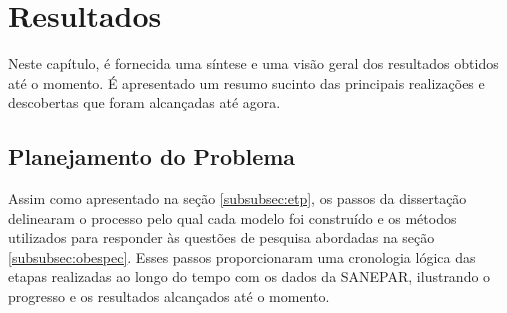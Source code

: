 \section{Resultados} \label{sec:result}

Neste capítulo, é fornecida uma síntese e uma visão geral dos resultados obtidos até o momento. É apresentado um resumo sucinto das principais realizações e descobertas que foram alcançadas até agora.


\subsection{Planejamento do Problema} \label{subsec:planexp}

Assim como apresentado na seção \ref{subsubsec:etp}, os passos da dissertação delinearam o processo pelo qual cada modelo foi construído e os métodos utilizados para responder às questões de pesquisa abordadas na seção \ref{subsubsec:obespec}. Esses passos proporcionaram uma cronologia lógica das etapas realizadas ao longo do tempo com os dados da SANEPAR, ilustrando o progresso e os resultados alcançados até o momento.

















    
  
 
 

 
  
    

    
